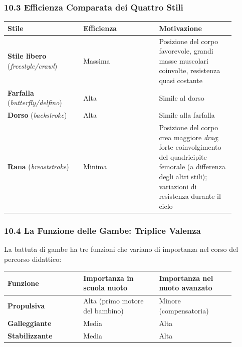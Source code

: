 \documentclass[a4paper,11pt]{article}
\begin{document}
\subsubsection{10.3 Efficienza Comparata dei Quattro
      Stili}\label{efficienza-comparata-dei-quattro-stili}

\begin{longtable}[]{@{}p{0.30\linewidth}p{0.30\linewidth}p{0.30\linewidth}@{}}
      \toprule\noalign{}
      Stile                                          & Efficienza & Motivazione              \\
      \midrule\noalign{}
      \endhead
      \bottomrule\noalign{}
      \endlastfoot
      \textbf{Stile libero} (\emph{freestyle/crawl}) & Massima    & Posizione del
      corpo favorevole, grandi masse muscolari coinvolte, resistenza quasi
      costante                                                                               \\
      \textbf{Farfalla} (\emph{butterfly/delfino})   & Alta       & Simile al dorso          \\
      \textbf{Dorso} (\emph{backstroke})             & Alta       & Simile alla farfalla     \\
      \textbf{Rana} (\emph{breaststroke})            & Minima     & Posizione del corpo crea
      maggiore \emph{drag}; forte coinvolgimento del quadricipite femorale (a
      differenza degli altri stili); variazioni di resistenza durante il
      ciclo                                                                                  \\
\end{longtable}

\subsubsection{10.4 La Funzione delle Gambe: Triplice
      Valenza}\label{la-funzione-delle-gambe-triplice-valenza}

La battuta di gambe ha tre funzioni che variano di importanza nel corso
del percorso didattico:

\begin{longtable}[]{@{}p{0.30\linewidth}p{0.30\linewidth}p{0.30\linewidth}@{}}
      \toprule\noalign{}
      Funzione               & Importanza in scuola nuoto      & Importanza nel nuoto avanzato \\
      \midrule\noalign{}
      \endhead
      \bottomrule\noalign{}
      \endlastfoot
      \textbf{Propulsiva}    & Alta (primo motore del bambino) & Minore
      (compensatoria)                                                                          \\
      \textbf{Galleggiante}  & Media                           & Alta                          \\
      \textbf{Stabilizzante} & Media                           & Alta                          \\
\end{longtable}
\end{document}
